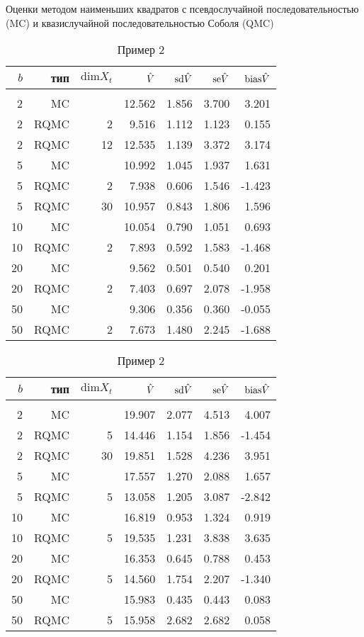 \begin{table}
    \renewcommand{\arraystretch}{0.6}
    \centering
    Оценки методом наименьших квадратов с псевдослучайной последовательностью (MC) и квазислучайной последовательностью Соболя (QMC)
    \caption{Пример 1}\label{tbl:lsm_sobol_ex1}
    \begin{tabular}{rrrrrrr}
        $b$&тип&$\mathrm{dim} X_t$&$\hat{V}$&$\mathrm{sd}\hat{V}$&$\mathrm{se}\hat{V}$&$\mathrm{bias}\hat{V}$\\[3pt]\hline\\[-8pt]
        2&MC&&12.562&1.856&3.700&3.201\\
        2&RQMC&2&9.516&1.112&1.123&0.155\\
        2&RQMC&12&12.535&1.139&3.372&3.174\\[3pt]
        5&MC&&10.992&1.045&1.937&1.631\\
        5&RQMC&2&7.938&0.606&1.546&-1.423\\
        5&RQMC&30&10.957&0.843&1.806&1.596\\[3pt]
        10&MC&&10.054&0.790&1.051&0.693\\
        10&RQMC&2&7.893&0.592&1.583&-1.468\\[3pt]
        20&MC&&9.562&0.501&0.540&0.201\\
        20&RQMC&2&7.403&0.697&2.078&-1.958\\[3pt]
        50&MC&&9.306&0.356&0.360&-0.055\\
        50&RQMC&2&7.673&1.480&2.245&-1.688\\[3pt]
    \end{tabular}

    \caption{Пример 2}\label{tbl:lsm_sobol_ex2}
    \begin{tabular}{rrrrrrr}
        $b$&тип&$\mathrm{dim} X_t$&$\hat{V}$&$\mathrm{sd}\hat{V}$&$\mathrm{se}\hat{V}$&$\mathrm{bias}\hat{V}$\\[3pt]\hline\\[-8pt]
        2&MC&&19.907&2.077&4.513&4.007\\
        2&RQMC&5&14.446&1.154&1.856&-1.454\\
        2&RQMC&30&19.851&1.528&4.236&3.951\\[3pt]
        5&MC&&17.557&1.270&2.088&1.657\\
        5&RQMC&5&13.058&1.205&3.087&-2.842\\[3pt]
        10&MC&&16.819&0.953&1.324&0.919\\
        10&RQMC&5&19.535&1.231&3.838&3.635\\[3pt]
        20&MC&&16.353&0.645&0.788&0.453\\
        20&RQMC&5&14.560&1.754&2.207&-1.340\\[3pt]
        50&MC&&15.983&0.435&0.443&0.083\\
        50&RQMC&5&15.958&2.682&2.682&0.058\\[3pt]
    \end{tabular}


\end{table}
